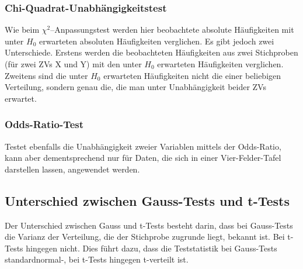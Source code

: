 \documentclass[a4paper]{article}
\begin{document}
\noindent {}

\subsubsection{Chi-Quadrat-Unabhängigkeitstest}\label{sec:chitest2}
Wie beim $\chi^2$--Anpassungstest werden hier beobachtete absolute Häufigkeiten mit unter $H_0$ erwarteten absoluten Häufigkeiten verglichen. Es gibt jedoch zwei Unterschiede. Erstens werden die beobachteten Häufigkeiten aus zwei Stichproben (für zwei ZVs X und Y) mit den unter $H_0$ erwarteten Häufigkeiten verglichen. Zweitens sind die unter $H_0$ erwarteten Häufigkeiten nicht die einer beliebigen Verteilung, sondern genau die, die man unter Unabhängigkeit beider ZVs erwartet.\\

\noindent {}

\subsubsection{Odds-Ratio-Test}\label{sec:ORtest}
Testet ebenfalls die Unabhängigkeit zweier Variablen mittels der Odds-Ratio, kann aber dementsprechend nur für Daten, die sich in einer Vier-Felder-Tafel darstellen lassen, angewendet werden.

\clearpage

\subsection{Unterschied zwischen Gauss-Tests und t-Tests}\label{sec:Gaussvst}
Der Unterschied zwischen Gauss und t-Tests besteht darin, dass bei Gauss-Tests die Varianz der Verteilung, die der Stichprobe zugrunde liegt, bekannt ist. Bei t-Tests hingegen nicht. Dies führt dazu, dass die Teststatistik bei Gauss-Tests standardnormal-, bei t-Tests hingegen t-verteilt ist.
\end{document}
